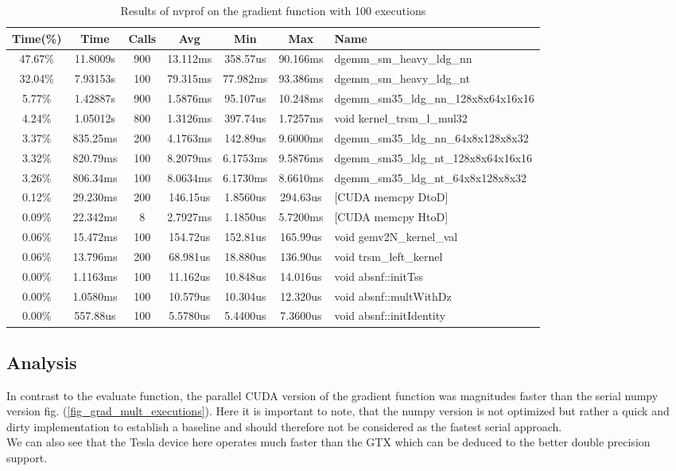 \begin{table}
	\centering
	\begin{tabular}{c|c|c|c|c|c|l}
		Time(\%) &     Time  &   Calls  &      Avg  &      Min  &      Max  & Name \\
		\hline
		47.67\% &  11.8009s &      900 &  13.112ms &  358.57us &  90.166ms &  dgemm\_sm\_heavy\_ldg\_nn \\
		32.04\% &  7.93153s &      100 &  79.315ms &  77.982ms &  93.386ms &  dgemm\_sm\_heavy\_ldg\_nt \\
		5.77\% &  1.42887s &      900 &  1.5876ms &  95.107us &  10.248ms &  dgemm\_sm35\_ldg\_nn\_128x8x64x16x16 \\
		4.24\% &  1.05012s &      800 &  1.3126ms &  397.74us &  1.7257ms &  void kernel\_trsm\_l\_mul32 \\
		3.37\% &  835.25ms &      200 &  4.1763ms &  142.89us &  9.6000ms &  dgemm\_sm35\_ldg\_nn\_64x8x128x8x32 \\
		3.32\% &  820.79ms &      100 &  8.2079ms &  6.1753ms &  9.5876ms &  dgemm\_sm35\_ldg\_nt\_128x8x64x16x16 \\
		3.26\% &  806.34ms &      100 &  8.0634ms &  6.1730ms &  8.6610ms &  dgemm\_sm35\_ldg\_nt\_64x8x128x8x32 \\
		0.12\% &  29.230ms &      200 &  146.15us &  1.8560us &  294.63us &  [CUDA memcpy DtoD] \\
		0.09\% &  22.342ms &        8 &  2.7927ms &  1.1850us &  5.7200ms &  [CUDA memcpy HtoD] \\
		0.06\% &  15.472ms &      100 &  154.72us &  152.81us &  165.99us &  void gemv2N\_kernel\_val \\
		0.06\% &  13.796ms &      200 &  68.981us &  18.880us &  136.90us &  void trsm\_left\_kernel \\
		0.00\% &  1.1163ms &      100 &  11.162us &  10.848us &  14.016us &  void absnf::initTss \\
		0.00\% &  1.0580ms &      100 &  10.579us &  10.304us &  12.320us &  void absnf::multWithDz \\
		0.00\% &  557.88us &      100 &  5.5780us &  5.4400us &  7.3600us &  void absnf::initIdentity \\
	\end{tabular}
	\caption{Results of nvprof on the gradient function with 100 executions \label{tab_gradient_nvprof}}
\end{table}

\subsection{Analysis}
In contrast to the evaluate function, the parallel CUDA version of the gradient function was magnitudes faster than the serial numpy version fig. (\ref{fig_grad_mult_executions}). Here it is important to note, that the numpy version is not optimized but rather a quick and dirty implementation to establish a baseline and should therefore not be considered as the fastest serial approach.  \\
We can also see that the Tesla device here operates much faster than the GTX which can be deduced to the better double precision support. \\

